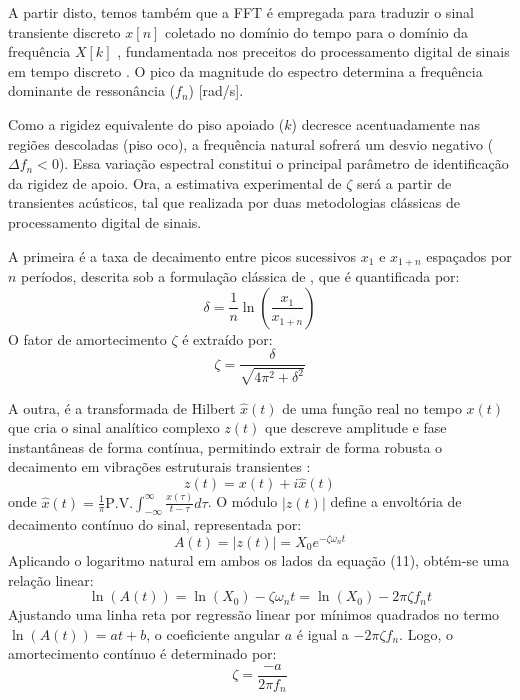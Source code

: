 \documentclass[10pt,twocolumn,fleqn]{article}
\begin{document}
	A partir disto, temos também que a FFT é empregada para traduzir o sinal transiente discreto $x[n]$ coletado no domínio do tempo para o domínio da frequência $X[k]$ \cite{roebben1997impulse}, fundamentada nos preceitos do processamento digital de sinais em tempo discreto \parencite{oppenheim2012processamento}. O pico da magnitude do espectro determina a frequência dominante de ressonância ($f_n$) [rad/s]. 
	
	Como a rigidez equivalente do piso apoiado ($k$) decresce acentuadamente nas regiões descoladas (piso oco), a frequência natural sofrerá um desvio negativo ($\Delta f_n < 0$). Essa variação espectral constitui o principal parâmetro de identificação da rigidez de apoio. Ora, a estimativa experimental de $\zeta$ será a partir de transientes acústicos, tal que realizada por duas metodologias clássicas de processamento digital de sinais.
	
	A primeira é a taxa de decaimento entre picos sucessivos $x_1$ e $x_{1+n}$ espaçados por $n$ períodos, descrita sob a formulação clássica de \textcite{rao2008vibracoes}, que é quantificada por:
	\begin{equation}
	\delta = \frac{1}{n}\ln\left(\frac{x_1}{x_{1+n}}\right)
	\end{equation}
	O fator de amortecimento $\zeta$ é extraído por:
	\begin{equation}
	\zeta = \frac{\delta}{\sqrt{4\pi^2 + \delta^2}}
	\end{equation}
	
	A outra, é a transformada de Hilbert $\hat{x}(t)$ de uma função real no tempo $x(t)$ que cria o sinal analítico complexo $z(t)$ que descreve amplitude e fase instantâneas de forma contínua, permitindo extrair de forma robusta o decaimento em vibrações estruturais transientes \parencite{feldman2011hilbert, huang1998empirical}:
	\begin{equation}
	z(t) = x(t) + i\hat{x}(t)
	\end{equation}
	onde $\hat{x}(t) = \frac{1}{\pi} \text{P.V.} \int_{-\infty}^{\infty} \frac{x(\tau)}{t-\tau} d\tau$. O módulo $|z(t)|$ define a envoltória de decaimento contínuo do sinal, representada por:
	\begin{equation}
	A(t) = |z(t)| = X_0 e^{-\zeta\omega_n t}
	\end{equation}
	Aplicando o logaritmo natural em ambos os lados da equação (11), obtém-se uma relação linear:
	\begin{equation}
	\ln(A(t)) = \ln(X_0) - \zeta\omega_n t = \ln(X_0) - 2\pi\zeta f_n t
	\end{equation}
	Ajustando uma linha reta por regressão linear por mínimos quadrados no termo $\ln(A(t)) = a t + b$, o coeficiente angular $a$ é igual a $-2\pi\zeta f_n$. Logo, o amortecimento contínuo é determinado por:
	\begin{equation}
	\zeta = \frac{-a}{2\pi f_n}
	\end{equation}
	
\end{document}
